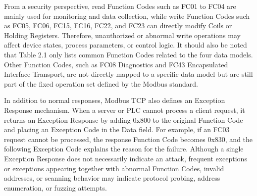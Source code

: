 \newpage
From a security perspective, read Function Codes such as FC01 to FC04 are mainly used for monitoring and data collection, while write Function Codes such as FC05, FC06, FC15, FC16, FC22, and FC23 can directly modify Coils or Holding Registers. Therefore, unauthorized or abnormal write operations may affect device states, process parameters, or control logic. It should also be noted that Table 2.1 only lists common Function Codes related to the four data models. Other Function Codes, such as FC08 Diagnostics and FC43 Encapsulated Interface Transport, are not directly mapped to a specific data model but are still part of the fixed operation set defined by the Modbus standard.

In addition to normal responses, Modbus TCP also defines an Exception Response mechanism. When a server or PLC cannot process a client request, it returns an Exception Response by adding 0x800 to the original Function Code and placing an Exception Code in the Data field. For example, if an FC03 request cannot be processed, the response Function Code becomes 0x830, and the following Exception Code explains the reason for the failure. Although a single Exception Response does not necessarily indicate an attack, frequent exceptions or exceptions appearing together with abnormal Function Codes, invalid addresses, or scanning behavior may indicate protocol probing, address enumeration, or fuzzing attempts.

